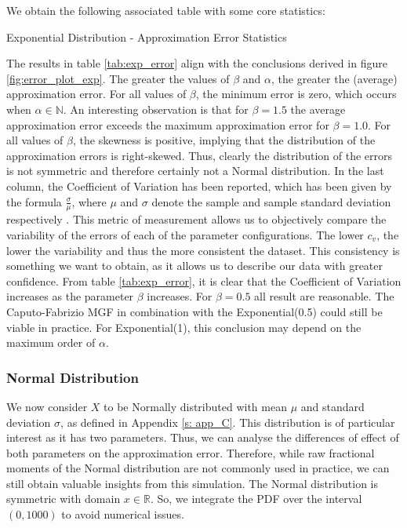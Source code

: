 We obtain the following associated table with some core statistics:
\begin{table}[H]
    \centering

\caption{Exponential Distribution - Approximation Error Statistics} 
\label{tab:exp_error}
\end{table}

The results in table \ref{tab:exp_error} align with the conclusions derived in figure \ref{fig:error_plot_exp}. The greater the values of \(\beta\) and \(\alpha\), the greater the (average) approximation error. For all values of \(\beta\), the minimum error is zero, which occurs when \(\alpha \in \mathbb{N}\). An interesting observation is that for \(\beta = 1.5\) the average approximation error exceeds the maximum approximation error for \(\beta = 1.0\). For all values of \(\beta\), the skewness is positive, implying that the distribution of the approximation errors is right-skewed. Thus, clearly the distribution of the errors is not symmetric and therefore certainly not a Normal distribution. In the last column, the Coefficient of Variation has been reported, which has been given by the formula \(\frac{\sigma}{\mu}\), where \(\mu\) and \(\sigma\) denote the sample and sample standard deviation respectively \cite{hendricks1936}. This metric of measurement allows us to objectively compare the variability of the errors of each of the parameter configurations. The lower \(c_v\), the lower the variability and thus the more consistent the dataset. This consistency is something we want to obtain, as it allows us to describe our data with greater confidence. From table \ref{tab:exp_error}, it is clear that the Coefficient of Variation increases as the parameter \(\beta\) increases. For \(\beta = 0.5\) all result are reasonable. The Caputo-Fabrizio MGF in combination with the Exponential(0.5) could still be viable in practice. For Exponential(1), this conclusion may depend on the maximum order of \(\alpha\).

\subsubsection{Normal Distribution}
We now consider \(X\) to be Normally distributed with mean \(\mu\) and standard deviation \(\sigma\), as defined in Appendix \ref{s: app_C}. This distribution is of particular interest as it has two parameters. Thus, we can analyse the differences of effect of both parameters on the approximation error. Therefore, while raw fractional moments of the Normal distribution are not commonly used in practice, we can still obtain valuable insights from this simulation.  The Normal distribution is symmetric with domain \(x \in \mathbb{R}\). So, we integrate the PDF over the interval \((0, 1000)\) to avoid numerical issues.
\newline

